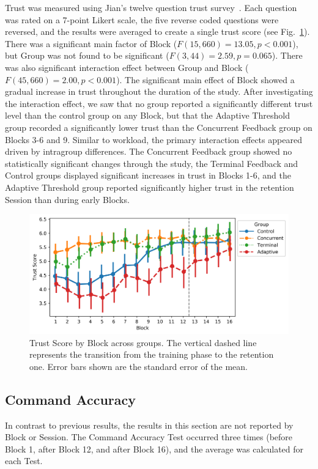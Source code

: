 Trust was measured using Jian's twelve question trust survey~\cite{jian_foundations_2000}.
Each question was rated on a 7-point Likert scale, the five reverse coded questions were reversed, and the results were averaged to create a single trust score (see Fig.~\ref{figure:label6}).
There was a significant main factor of Block ($F(15, 660) = 13.05, p < 0.001$), but Group was not found to be significant ($F(3, 44) = 2.59, p = 0.065$).
There was also significant interaction effect between Group and Block ($F(45, 660) = 2.00, p < 0.001$).
The significant main effect of Block showed a gradual increase in trust throughout the duration of the study.
After investigating the interaction effect, we saw that no group reported a significantly different trust level than the control group on any Block, but that the Adaptive Threshold group recorded a significantly lower trust than the Concurrent Feedback group on Blocks 3-6 and 9.
Similar to workload, the primary interaction effects appeared driven by intragroup differences.
The Concurrent Feedback group showed no statistically significant changes through the study, the Terminal Feedback and Control groups displayed significant increases in trust in Blocks 1-6, and the Adaptive Threshold group reported significantly higher trust in the retention Session than during early Blocks.

\begin{figure}[hbt!]
\centering
\includegraphics[height=.4\textwidth]{figures/TrustScore}
\caption{\label{figure:label6} Trust Score by Block across groups.
The vertical dashed line represents the transition from the training phase to the retention one.
Error bars shown are the standard error of the mean.}
\end{figure}

\subsection{Command Accuracy}
In contrast to previous results, the results in this section are not reported by Block or Session.
The Command Accuracy Test occurred three times (before Block 1, after Block 12, and after Block 16), and the average was calculated for each Test.

